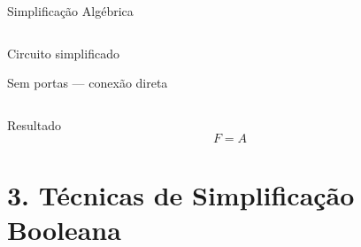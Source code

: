 \documentclass[9pt]{beamer}
\begin{document}
\begin{frame}[fragile]{Simplificação Algébrica}
\begin{columns}
\begin{block}{Circuito simplificado}
\begin{center}

\vspace{0.2cm}
\textcolor{green!60!black}{\tiny Sem portas — conexão direta}
\end{center}
\end{block}

\end{columns}

\vspace{0.3cm}

\begin{alertblock}{Resultado}
\[
F = A
\]
\end{alertblock}

\end{frame}

\section{3. Técnicas de Simplificação Booleana}
\end{document}
